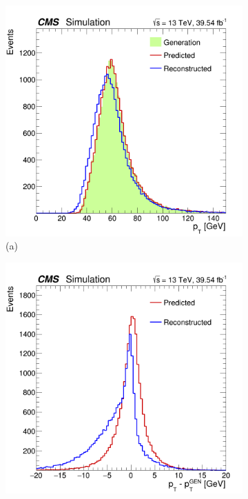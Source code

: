 \begin{figure}[!ht]
    \captionsetup[subfigure]{labelformat=empty}
    \vspace*{-0.2cm}
    \centering
    \setlength{\mylength}{\textwidth}
    \begin{subfigure}[t]{0.50\mylength}
        \centering
        \includegraphics[width=0.49\mylength]{resources/plots/Phi3_model_pt.png}
        \vspace*{-0.2cm}
        \caption{\footnotesize (a)}
    \end{subfigure}%
    \begin{subfigure}[t]{0.50\mylength}
        \centering
        \includegraphics[width=0.49\mylength]{resources/plots/Phi3_model_pt_residuals.png}

\end{subfigure}
\end{figure}
